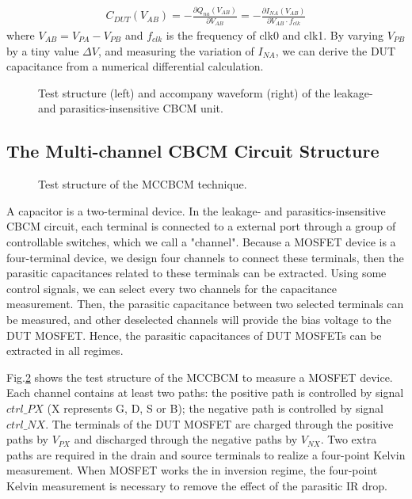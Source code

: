 \documentclass[journal]{IEEEtran}
\begin{document}
\begin{align}
  C_{DUT}(V_{AB})=-\frac{\partial Q_{na}(V_{AB})}{\partial V_{AB}}=-\frac{\partial I_{NA}(V_{AB})}{\partial V_{AB}\cdot f_{clk}}
\end{align}
where $V_{AB}=V_{PA}-V_{PB}$ and $f_{clk}$ is the frequency of clk0 and clk1. By varying $V_{PB}$ by a tiny value $\Delta V$, and measuring the variation of $I_{NA}$, we can derive the DUT capacitance from a numerical differential calculation.


\begin{figure}
\caption{Test structure (left) and accompany waveform (right) of the leakage- and parasitics-insensitive CBCM unit. }
\label{Fig1}
\end{figure}




\subsection{The Multi-channel CBCM Circuit Structure}

\begin{figure}
\caption{Test structure of the MCCBCM technique. }
\label{Fig2}
\end{figure}




A capacitor is a two-terminal device. In the leakage- and parasitics-insensitive CBCM circuit, each terminal is connected to a external port through a group of controllable switches, which we call a "channel". Because a MOSFET device is a four-terminal device, we design four channels to connect these terminals, then the parasitic capacitances related to these terminals can be extracted. Using some control signals, we can select every two channels for the capacitance measurement. Then, the parasitic capacitance between two selected terminals can be measured, and other deselected channels will provide the bias voltage to the DUT MOSFET. Hence, the parasitic capacitances of DUT MOSFETs can be extracted in all regimes.  

Fig.\ref{Fig2} shows the test structure of the MCCBCM to measure a MOSFET device. Each channel contains at least two paths: the positive path is controlled by signal $ctrl\_PX$ (X represents G, D, S or B); the negative path is controlled by signal $ctrl\_NX$. The terminals of the DUT MOSFET are charged through the positive paths by $V_{PX}$ and discharged through the negative paths by $V_{NX}$. Two extra paths are required in the drain and source terminals to realize a four-point Kelvin measurement. When MOSFET works the in inversion regime, the four-point Kelvin measurement is necessary to remove the effect of the parasitic IR drop. 
\end{document}
